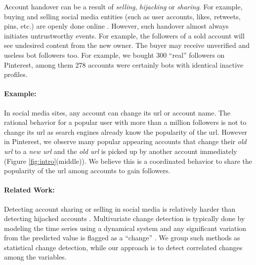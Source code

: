 Account handover can be a result of {\it selling}, {\it hijacking} or {\it sharing}. For example, buying and selling social media entities (such as user accounts, likes, retweets, pins, etc.) are openly done online \cite{buyFollower,buyAccount1,buyAccount2,Thomas:13}. However, such handover almost always initiates untrustworthy events. For example, the followers of a sold account will see undesired content from the new owner. The buyer may receive unverified and useless bot followers too. For example, we bought 300 ``real'' followers on Pinterest, among them 278 accounts were certainly bots with identical inactive profiles.

\paragraph{Example:} In social media sites, any account can change its url or account name. The rational behavior for a popular user with more than a million followers is not to change its url as search engines already know the popularity of the url. However in Pinterest, we observe many popular appearing accounts that change their {\it old url} to a {\it new url} and the {\it old url} is picked up by another account immediately (Figure \ref{fig:intro}(middle)). We believe this is a coordinated behavior to share the popularity of the url among accounts to gain followers. 




\paragraph{Related Work:} Detecting account sharing or selling in social media is relatively harder than detecting hijacked accounts \cite{Thomas2014}. Multivariate change detection is typically done by modeling the time series using a dynamical system and any significant variation from the predicted value is flagged as a ``change'' \cite{Abraham79,Ma2003}. We group such methods as statistical change detection, while our approach is to detect correlated changes among the variables.


